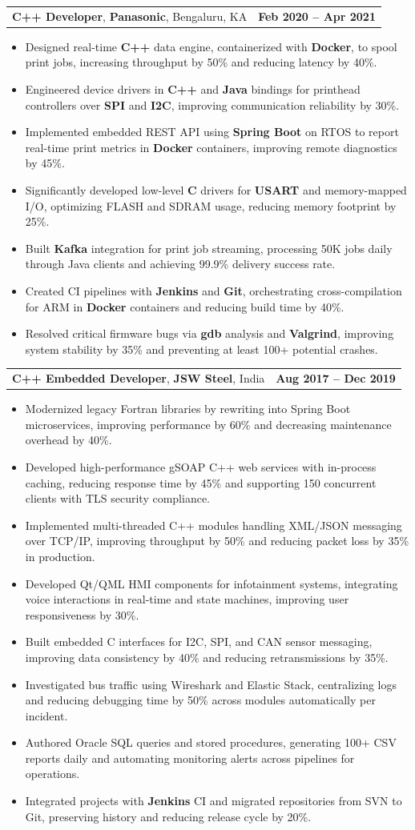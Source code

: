 \documentclass[letterpaper,11pt]{article}
\makeatletter
\newcommand{\resumeItem}[1]{
  \item\footnotesize{
    {#1 \vspace{-2pt}}
  }
}
\newcommand{\resumeSubheading}[4]{
  \vspace{-2pt}\item
    \begin{tabular*}{1.0\textwidth}[t]{l@{\extracolsep{\fill}}r}
      \textbf{\fontsize{10pt}{14pt}\selectfont #3}, \textbf{\fontsize{10pt}{14pt}\selectfont #1}, \fontsize{10pt}{14pt}\selectfont #4 & \textbf{\fontsize{10pt}{14pt}\selectfont #2} \\
    \end{tabular*}\vspace{-7pt}
}
\newcommand{\resumeItemListStart}{\begin{itemize}[leftmargin=*]}
\newcommand{\resumeItemListEnd}{\end{itemize}\vspace{-5pt}}
\makeatother
\begin{document}
    \resumeSubheading
        {Panasonic}{Feb 2020 -- Apr 2021}
        {C++ Developer}{Bengaluru, KA}
      \resumeItemListStart
        \resumeItem{Designed real-time \textbf{C++} data engine, containerized with \textbf{Docker}, to spool print jobs, increasing throughput by 50\% and reducing latency by 40\%.}
        \resumeItem{Engineered device drivers in \textbf{C++} and \textbf{Java} bindings for printhead controllers over \textbf{SPI} and \textbf{I2C}, improving communication reliability by 30\%.}
        \resumeItem{Implemented embedded REST API using \textbf{Spring Boot} on RTOS to report real-time print metrics in \textbf{Docker} containers, improving remote diagnostics by 45\%.}
        \resumeItem{Significantly developed low-level \textbf{C} drivers for \textbf{USART} and memory-mapped I/O, optimizing FLASH and SDRAM usage, reducing memory footprint by 25\%.}
        \resumeItem{Built \textbf{Kafka} integration for print job streaming, processing 50K jobs daily through Java clients and achieving 99.9\% delivery success rate.}
        \resumeItem{Created CI pipelines with \textbf{Jenkins} and \textbf{Git}, orchestrating cross-compilation for ARM in \textbf{Docker} containers and reducing build time by 40\%.}
        \resumeItem{Resolved critical firmware bugs via \textbf{gdb} analysis and \textbf{Valgrind}, improving system stability by 35\% and preventing at least 100+ potential crashes.}
      \resumeItemListEnd

    \resumeSubheading
        {JSW Steel}{Aug 2017 -- Dec 2019}
        {C++ Embedded Developer}{India}
      \resumeItemListStart
        \resumeItem{Modernized legacy Fortran libraries by rewriting into Spring Boot microservices, improving performance by 60\% and decreasing maintenance overhead by 40\%.}
        \resumeItem{Developed high-performance gSOAP C++ web services with in-process caching, reducing response time by 45\% and supporting 150 concurrent clients with TLS security compliance.}
        \resumeItem{Implemented multi-threaded C++ modules handling XML/JSON messaging over TCP/IP, improving throughput by 50\% and reducing packet loss by 35\% in production.}
        \resumeItem{Developed Qt/QML HMI components for infotainment systems, integrating voice interactions in real-time and state machines, improving user responsiveness by 30\%.}
        \resumeItem{Built embedded C interfaces for I2C, SPI, and CAN sensor messaging, improving data consistency by 40\% and reducing retransmissions by 35\%.}
        \resumeItem{Investigated bus traffic using Wireshark and Elastic Stack, centralizing logs and reducing debugging time by 50\% across modules automatically per incident.}
        \resumeItem{Authored Oracle SQL queries and stored procedures, generating 100+ CSV reports daily and automating monitoring alerts across pipelines for operations.}
        \resumeItem{Integrated projects with \textbf{Jenkins} CI and migrated repositories from SVN to Git, preserving history and reducing release cycle by 20\%.}
      \resumeItemListEnd
\end{document}
